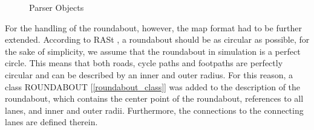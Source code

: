 \documentclass[11pt,oneside,openright]{mpreport}
\begin{document}
\begin{figure}[!ht]
\begin{center}
\caption{Parser Objects}
\label{parer_objects}
\end{center}
\end{figure}


% 

For the handling of the roundabout, however, the map format had to be further extended. According to RASt \cite{rast06}, a roundabout should be as circular as possible, 
for the sake of simplicity, we assume that the roundabout in simulation is a perfect circle. This means that both roads,
cycle paths and footpaths are perfectly circular and can be described by an inner and outer radius. For this reason, a class ROUNDABOUT [\cref{roundabout_class}] was added to the description of the roundabout,
which contains the center point of the roundabout, references to all lanes, and inner and outer radii. Furthermore, the connections to the connecting lanes are defined therein.
\end{document}
